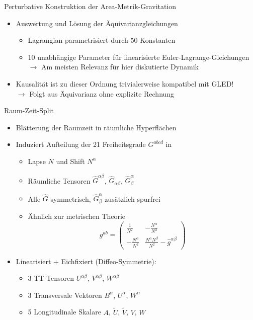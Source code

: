 \documentclass{beamer}
\begin{document}
    \begin{frame}{Perturbative Konstruktion der Area-Metrik-Gravitation}
        \begin{itemize}
            \item Auswertung und Lösung der Äquivarianzgleichungen
            \begin{itemize}
                \item Lagrangian parametrisiert durch 50 Konstanten
                \item \alert{10 unabhängige Parameter für linearisierte Euler-Lagrange-Gleichungen} \\
                $\rightarrow$ Am meisten Relevanz für hier diskutierte Dynamik
            \end{itemize} \pause
            \item Kausalität ist zu dieser Ordnung trivialerweise kompatibel mit GLED! \\
            $\rightarrow$ Folgt aus Äquivarianz ohne explizite Rechnung
        \end{itemize}
    \end{frame}

    \begin{frame}{Raum-Zeit-Split}
        \begin{itemize}
            \item Blätterung der Raumzeit in räumliche Hyperflächen
            \item Induziert Aufteilung der 21 Freiheitsgrade $G^{abcd}$ in
            \begin{itemize}
                \item Lapse $N$ und Shift $N^\alpha$
                \item Räumliche Tensoren $\hat G^{\alpha\beta}$, $\hat G_{\alpha\beta}$, $\hat G^\alpha_\beta$
                \item Alle $\hat G$ symmetrisch, $\hat G^\alpha_\beta$ zusätzlich spurfrei
                \item Ähnlich zur metrischen Theorie
                \[ g^{ab} = \left( \begin{array}{c|c}
                                       \frac{1}{N^2} & -\frac{N^\alpha}{N^2} \\ \hline -\frac{N^\alpha}{N^2} & \frac{N^\alpha N^\beta}{N^2} - \hat g^{\alpha\beta}
                \end{array} \right) \]
            \end{itemize}
            \item Linearisiert + Eichfixiert (Diffeo-Symmetrie):
            \begin{itemize}
                \item 3 TT-Tensoren $U^{\alpha\beta}$, $V^{\alpha\beta}$, $W^{\alpha\beta}$
                \item 3 Transversale Vektoren $B^\alpha$, $U^\alpha$, $W^\alpha$
                \item 5 Longitudinale Skalare $A$, $\tilde U$, $\tilde V$, $V$, $W$
            \end{itemize}
        \end{itemize}
    \end{frame}
\end{document}
